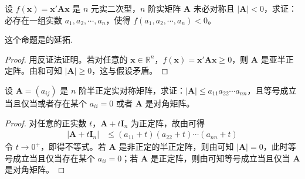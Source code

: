\documentclass[../../main.tex]{subfiles}
\begin{document}
\begin{proposition}\label{proposition:对应矩阵的行列式小于零的二次型必存在小于零的一点}
设 \(f(\boldsymbol{x})=\boldsymbol{x}'\boldsymbol{A}\boldsymbol{x}\) 是 \(n\) 元实二次型，\(n\) 阶实矩阵 \(\boldsymbol{A}\) 未必对称且 \(|\boldsymbol{A}|<0\)，求证：必存在一组实数 \(a_1,a_2,\cdots,a_n\)，使得 \(f(a_1,a_2,\cdots,a_n)<0\)。
\end{proposition}
\begin{remark}
这个命题是的延拓.
\end{remark}
\begin{proof}
用反证法证明。若对任意的 \(\boldsymbol{x}\in\mathbb{R}^n\)，\(f(\boldsymbol{x})=\boldsymbol{x}'\boldsymbol{A}\boldsymbol{x}\geq0\)，则 \(\boldsymbol{A}\) 是亚半正定阵。由和可知 \(|\boldsymbol{A}|\geq0\)，这与假设矛盾。
\end{proof}

\begin{proposition}\label{proposition:半正定阵行列式与主对角乘积的不等式}
设 \(\boldsymbol{A}=(a_{ij})\) 是 \(n\) 阶半正定实对称矩阵，求证：\(|\boldsymbol{A}|\leq a_{11}a_{22}\cdots a_{nn}\)，且等号成立当且仅当或者存在某个 \(a_{ii}=0\) 或者 \(\boldsymbol{A}\) 是对角矩阵。 
\end{proposition}
\begin{proof}
对任意的正实数 \(t\)，\(\boldsymbol{A}+t\boldsymbol{I}_n\) 为正定阵，故由可得
\begin{align*}
|\boldsymbol{A}+t\boldsymbol{I}_n|&\leq(a_{11}+t)(a_{22}+t)\cdots(a_{nn}+t)
\end{align*}
令 \(t\to0^+\)，即得不等式。若 \(\boldsymbol{A}\) 是非正定的半正定阵，则由可知 \(|\boldsymbol{A}| = 0\)，此时等号成立当且仅当存在某个 \(a_{ii}=0\)；若 \(\boldsymbol{A}\) 是正定阵，则由可知等号成立当且仅当 \(\boldsymbol{A}\) 是对角矩阵。
\end{proof}
\end{document}
